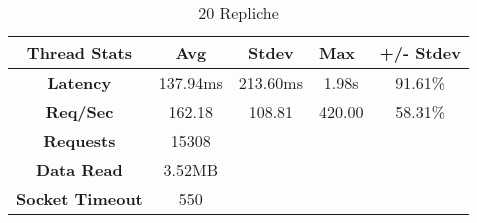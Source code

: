 \begin{table}[H]
\caption{20 Repliche}
\centering
\label{tab:bench-replica-20}
\begin{tabular}{|c|c|ccc}
\hline
\textbf{Thread Stats}   & \textbf{Avg} & \multicolumn{1}{c|}{\textbf{Stdev}} & \multicolumn{1}{l|}{\textbf{Max}} & \multicolumn{1}{l|}{\textbf{+/- Stdev}} \\ \hline
\textbf{Latency}        & 137.94ms     & \multicolumn{1}{c|}{213.60ms}       & \multicolumn{1}{c|}{1.98s}        & \multicolumn{1}{c|}{91.61\%}            \\ \hline
\textbf{Req/Sec}        & 162.18       & \multicolumn{1}{c|}{108.81}         & \multicolumn{1}{c|}{420.00}       & \multicolumn{1}{c|}{58.31\%}            \\ \hline
\textbf{Requests}       & 15308        &                                     &                                   &                                         \\ \cline{1-2}
\textbf{Data Read}      & 3.52MB       &                                     &                                   &                                         \\ \cline{1-2}
\textbf{Socket Timeout} & 550          &                                     &                                   &                                         \\ \cline{1-2}
\end{tabular}
\end{table}